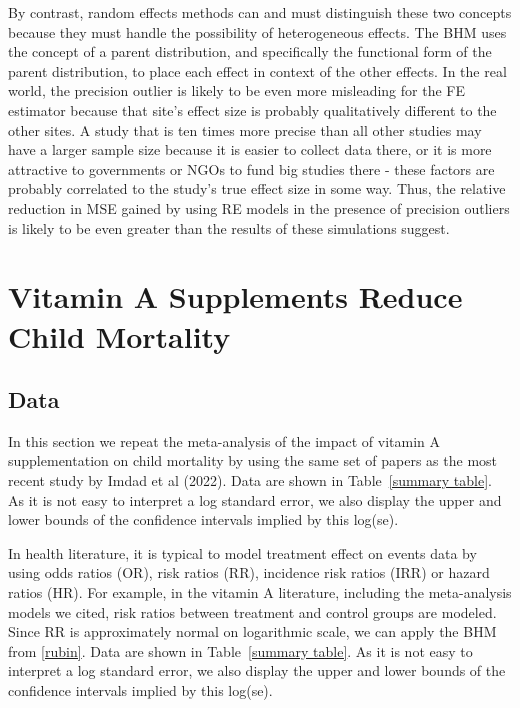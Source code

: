 \documentclass[12pt]{article}
\begin{document}
By contrast, random effects methods can and must distinguish these two concepts because they must handle the possibility of heterogeneous effects. The BHM uses the concept of a parent distribution, and specifically the functional form of the parent distribution, to place each effect in context of the other effects. In the real world, the precision outlier is likely to be even more misleading for the FE estimator because that site's effect size is probably qualitatively different to the other sites. A study that is ten times more precise than all other studies may have a larger sample size because it is easier to collect data there, or it is more attractive to governments or NGOs to fund big studies there - these factors are probably correlated to the study's true effect size in some way. Thus, the relative reduction in MSE gained by using RE models in the presence of precision outliers is likely to be even greater than the results of these simulations suggest. 

\section{Vitamin A Supplements Reduce Child Mortality}

\subsection{Data}

In this section we repeat the meta-analysis of the impact of vitamin A supplementation on child mortality by using the same set of papers as the most recent study by Imdad et al (2022). Data are shown in Table~\ref{summary table}. 
As it is not easy to interpret a log standard error, we also display the upper and lower bounds of the confidence intervals implied by this log(se). 



In health literature, it is typical to model treatment effect on events data by using odds ratios (OR), risk ratios (RR), incidence risk ratios (IRR) or hazard ratios (HR). For example, in the vitamin A literature, including the meta-analysis models we cited, risk ratios between treatment and control groups are modeled. Since RR is approximately normal on logarithmic scale, we can apply the BHM from \eqref{rubin}. Data are shown in Table~\ref{summary table}. As it is not easy to interpret a log standard error, we also display the upper and lower bounds of the confidence intervals implied by this log(se).
\end{document}

